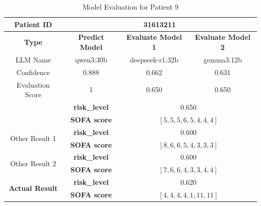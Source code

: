 \begin{table}[htbp]
 \centering
 \caption{Model Evaluation for Patient 9}
 \label{tab:patient9}
 \begin{tabular}{cccc}
 \toprule
 \textbf{ Patient ID } & \multicolumn{3}{c}{31613211} \\
 \midrule
 \textbf{ Type } & \textbf{ Predict Model } & \textbf{ Evaluate Model 1 } & \textbf{ Evaluate Model 2 } \\
 LLM Name & qwen3:30b & deepseek-r1:32b & gemma3:12b \\
 Confidence & 0.888 & 0.662 & 0.631 \\
 Evaluation Score & 1 & 0.650 & 0.650 \\
 \midrule
 \addlinespace
 \multirow{2}{*}{\textbf{ Best Result }} & \textbf{ risk\_level } & \multicolumn{2}{c}{0.650} \\
      & \textbf{ SOFA score } & \multicolumn{2}{c}{$[5, 5, 5, 6, 5, 4, 4, 4]$} \\
 \midrule
 \multirow{2}{*}{Other Result 1} & \textbf{ risk\_level } & \multicolumn{2}{c}{0.600} \\
      & \textbf{ SOFA score } & \multicolumn{2}{c}{$[8, 6, 6, 5, 4, 3, 3, 3]$} \\
 \midrule
 \multirow{2}{*}{Other Result 2} & \textbf{ risk\_level } & \multicolumn{2}{c}{0.600} \\
      & \textbf{ SOFA score } & \multicolumn{2}{c}{$[7, 6, 6, 4, 3, 3, 4, 4]$} \\
 \midrule
 \multirow{2}{*}{\textbf{ Actual Result }} & \textbf{ risk\_level } & \multicolumn{2}{c}{0.620} \\
      & \textbf{ SOFA score } & \multicolumn{2}{c}{$[4, 4, 4, 4, 1, 11, 11]$} \\
 \bottomrule
 \end{tabular}
\end{table}

